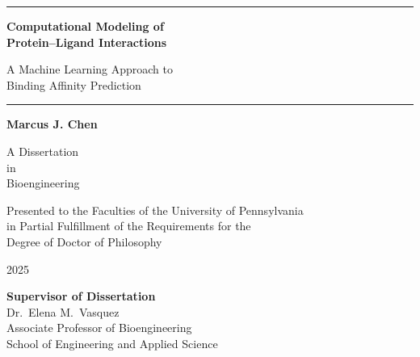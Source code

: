 \documentclass[12pt,oneside]{report}
\begin{document}
\begin{titlepage}
\thispagestyle{empty}
\begin{center}


\vspace*{2.5cm}

{\color{UPennBlue}\rule{\textwidth}{1.2pt}\par}
\vspace{1.5cm}

{\Huge\bfseries\color{UPennBlue} Computational Modeling of\\[6pt] Protein--Ligand Interactions}

\vspace{1cm}

{\LARGE\color{Charcoal} A Machine Learning Approach to\\[4pt] Binding Affinity Prediction}

\vspace{1.5cm}

{\color{UPennBlue}\rule{\textwidth}{1.2pt}\par}
\vspace{2cm}

{\Large\bfseries Marcus J. Chen}

\vspace{0.5cm}

{\large A Dissertation\\[4pt] in\\[4pt] Bioengineering}

\vspace{1cm}

{\large Presented to the Faculties of the University of Pennsylvania\\[4pt] in Partial Fulfillment of the Requirements for the\\[4pt] Degree of Doctor of Philosophy}

\vspace{1.2cm}

{\large 2025}

\vspace{1cm}

\begin{minipage}{0.7\textwidth}
\centering
{\large\bfseries Supervisor of Dissertation}\\[8pt]
{\large Dr.\ Elena M.\ Vasquez}\\[4pt]
{\normalsize Associate Professor of Bioengineering}\\[4pt]
{\normalsize School of Engineering and Applied Science}
\end{minipage}


\end{center}
\end{titlepage}
\end{document}

